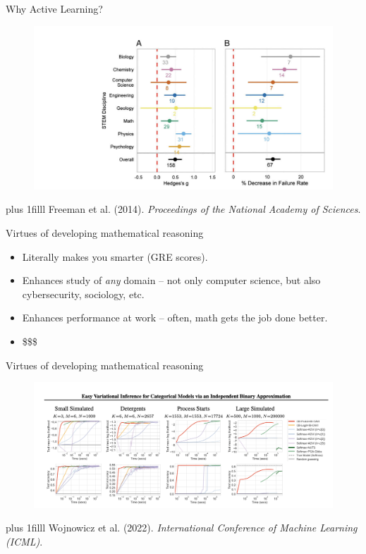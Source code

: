 \documentclass[t, aspectratio = 137, xcolor=dvipsnames,table,compress]{beamer}
\newcommand{\citebottom}[1]{
\vskip0pt plus 1filll  \tiny {#1}
}
\begin{document}
\begin{frame}{Why Active Learning?}
    \begin{figure}
        \centering
        \includegraphics[width=.7\textwidth]{images/active_learning} 
    \end{figure}
	\citebottom{\hfill Freeman et al. (2014). \textit{Proceedings of the National Academy of Sciences}. \hfill }
\end{frame}

\begin{frame}{Virtues of developing mathematical reasoning}

\begin{itemize}
\item Literally makes you smarter (GRE scores).
\item Enhances study of \textit{any} domain -- not only computer science, but also cybersecurity, sociology, etc. 
\item Enhances performance at work -- often, math gets the job done better.
\item \$\$\$
\end{itemize}

\end{frame}



\begin{frame}{Virtues of developing mathematical reasoning}
    \begin{figure}
        \centering
        \includegraphics[width=.9\textwidth]{images/icml} 
    \end{figure}
   \citebottom{\hfill Wojnowicz et al. (2022). \textit{International Conference of Machine Learning (ICML)}. \hfill }
	
\end{frame}
\end{document}
